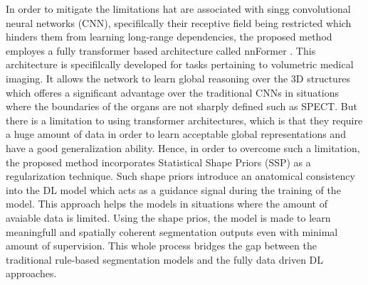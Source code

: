 In order to mitigate the limitations hat are associated with singg convolutional neural networks (CNN), specifilcally their receptive field being restricted which hinders them from learning long-range dependencies, the proposed method employes a fully transformer based architecture called nnFormer \cite{zhou2023nnformer}. This architecture is specifilcally developed for tasks pertaining to volumetric medical imaging. It allows the network to learn global reasoning over the 3D structures which offeres a significant advantage over the traditional CNNs in situations where the boundaries of the organs are not sharply defined such as SPECT. But there is a limitation to using transformer architectures, which is that they require a huge amount of data in order to learn acceptable global representations and have a good generalization ability. Hence, in order to overcome such a limitation, the proposed method incorporates Statistical Shape Priors (SSP) as a regularization technique. Such shape priors introduce an anatomical consistency into the DL model which acts as a guidance signal during the training of the model. This approach helps the models in situations where the amount of avaiable data is limited. Using the shape prios, the model is made to learn meaningfull and spatially coherent segmentation outputs even with minimal amount of supervision. This whole process bridges the gap between the traditional rule-based segmentation models and the fully data driven DL approaches.